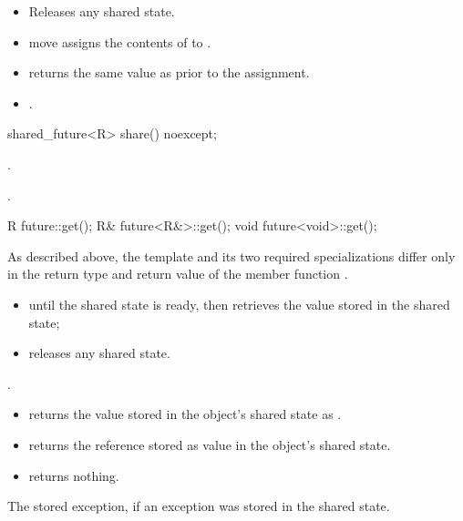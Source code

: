 \begin{itemdescr}
\pnum
\effects
\begin{itemize}
\item
Releases any shared state.
\item
move assigns the contents of  to .
\end{itemize}

\pnum
\ensures
\begin{itemize}
\item
{} returns the same value as  prior to the
assignment.

\item
{}.
\end{itemize}
\end{itemdescr}

%
\begin{itemdecl}
shared_future<R> share() noexcept;
\end{itemdecl}

\begin{itemdescr}
\pnum
\ensures
{}.

\pnum
\returns
{}.
\end{itemdescr}

%
\begin{itemdecl}
R future::get();
R& future<R&>::get();
void future<void>::get();
\end{itemdecl}

\begin{itemdescr}
\pnum
\begin{note}
As described above, the template and its two required specializations differ only in
the return type and return value of the member function .
\end{note}

\pnum
\effects
\begin{itemize}
\item {} until the shared state is ready, then retrieves the
value stored in the shared state;
\item releases any shared state.
\end{itemize}

\pnum
\ensures
{}.

\pnum
\returns
\begin{itemize}
\item
{} returns the value  stored in the object's shared state as
.

\item
{} returns the reference stored as value in the object's shared state.

\item
{} returns nothing.
\end{itemize}

\pnum
\throws
The stored exception, if an exception was stored in the shared state.
\end{itemdescr}

